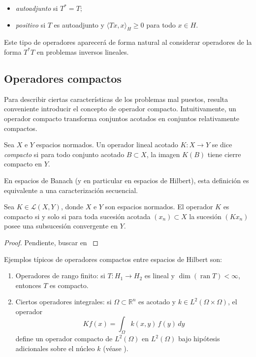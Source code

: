 \begin{itemize}
  \item \emph{autoadjunto} si $T^{*} = T$;
  \item \emph{positivo} si $T$ es autoadjunto y $\langle T x,x \rangle_{H} \ge 0$ para todo $x \in H$.
\end{itemize}

Este tipo de operadores aparecerá de forma natural al considerar operadores de la forma $T^{*}T$ en problemas inversos lineales.


\subsection{Operadores compactos}

Para describir ciertas características de los problemas mal puestos, resulta conveniente introducir el concepto de operador compacto. Intuitivamente, un operador compacto transforma conjuntos acotados en conjuntos relativamente compactos.

\begin{definition}
Sea $X$ e $Y$ espacios normados. Un operador lineal acotado $K : X \to Y$ se dice \emph{compacto} si para todo conjunto acotado $B \subset X$, la imagen $K(B)$ tiene cierre compacto en $Y$.
\end{definition}

En espacios de Banach (y en particular en espacios de Hilbert), esta definición es equivalente a una caracterización secuencial.

\begin{proposition}
Sea $K \in \mathcal{L}(X,Y)$, donde $X$ e $Y$ son espacios normados. El operador $K$ es compacto si y solo si para toda sucesión acotada $(x_{n}) \subset X$ la sucesión $(Kx_{n})$ posee una subsucesión convergente en $Y$.
\end{proposition}

\begin{proof}
    Pendiente, buscar en \cite{rynne_youngson2000}
\end{proof}


\begin{example}
Ejemplos típicos de operadores compactos entre espacios de Hilbert son:
\begin{enumerate}
  \item Operadores de rango finito: si $T : H_{1} \to H_{2}$ es lineal y $\dim(\operatorname{ran} T) < \infty$, entonces $T$ es compacto.
  \item Ciertos operadores integrales: si $\Omega \subset \mathbb{R}^{n}$ es acotado y $k \in L^{2}(\Omega \times \Omega)$, el operador
  \[
  K f(x) = \int_{\Omega} k(x,y)\,f(y)\,dy
  \]
  define un operador compacto de $L^{2}(\Omega)$ en $L^{2}(\Omega)$ bajo hipótesis adicionales sobre el núcleo $k$ (véase \cite{kirsch2011,natterer2001}).
\end{enumerate}
\end{example}

